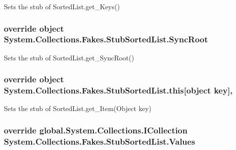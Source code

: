 Sets the stub of Sorted\-List.\-get\-\_\-\-Keys()

\hypertarget{class_system_1_1_collections_1_1_fakes_1_1_stub_sorted_list_a71de4f16f46efe09f7d91dbecbb42ef2}{
\subsubsection[{Sync\-Root}]{\setlength{\rightskip}{0pt plus 5cm}override object System.\-Collections.\-Fakes.\-Stub\-Sorted\-List.\-Sync\-Root\hspace{0.3cm}{\ttfamily [get]}}}\label{class_system_1_1_collections_1_1_fakes_1_1_stub_sorted_list_a71de4f16f46efe09f7d91dbecbb42ef2}


Sets the stub of Sorted\-List.\-get\-\_\-\-Sync\-Root()

\hypertarget{class_system_1_1_collections_1_1_fakes_1_1_stub_sorted_list_a2f08215391ef9f9d7d16133b09c4db01}{
\subsubsection[{this[object key]}]{\setlength{\rightskip}{0pt plus 5cm}override object System.\-Collections.\-Fakes.\-Stub\-Sorted\-List.\-this\mbox{[}object key\mbox{]}\hspace{0.3cm}{\ttfamily [get]}, {\ttfamily [set]}}}\label{class_system_1_1_collections_1_1_fakes_1_1_stub_sorted_list_a2f08215391ef9f9d7d16133b09c4db01}


Sets the stub of Sorted\-List.\-get\-\_\-\-Item(\-Object key)

\hypertarget{class_system_1_1_collections_1_1_fakes_1_1_stub_sorted_list_a9a44c7708ffdabdf71dfc862215e0818}{
\subsubsection[{Values}]{\setlength{\rightskip}{0pt plus 5cm}override global.\-System.\-Collections.\-I\-Collection System.\-Collections.\-Fakes.\-Stub\-Sorted\-List.\-Values\hspace{0.3cm}{\ttfamily [get]}}}\label{class_system_1_1_collections_1_1_fakes_1_1_stub_sorted_list_a9a44c7708ffdabdf71dfc862215e0818}


